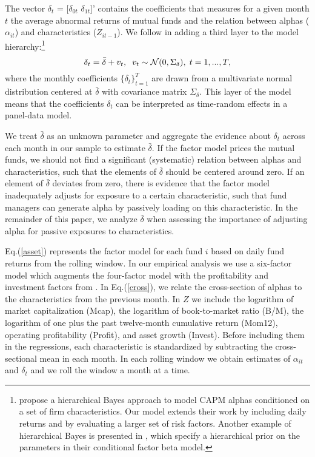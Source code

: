 The vector $\delta_t$ = [$\delta_{0t}$ $\delta_{1t}$]' contains the coefficients that measures for a given month $t$  the average abnormal returns of mutual funds and the relation between alphas ($\alpha_{it}$) and characteristics ($Z_{it-1}$). We follow \citet{cederburg2015asset} in adding a third layer to the model hierarchy:\footnote{\citet{cederburg2015asset} propose a hierarchical Bayes approach to model CAPM alphas conditioned on a set of firm characteristics. Our model extends their work by including daily returns and by evaluating a larger set of risk factors. Another example of hierarchical Bayes is presented in \citet{cosemans2015estimating}, which specify a hierarchical prior on the parameters in their conditional factor beta model. } 
\begin{equation}
\label{delta_t}
\delta_t = \bar{\delta} + v_t, \hspace{0.2cm} v_t \sim \mathcal{N}(0,\Sigma_{\delta}), \hspace{0.1cm} t = 1,...,T,
\end{equation}
where the monthly coefficients $\{\delta_t\}^T_{t=1}$ are drawn from a multivariate normal distribution centered at $\bar{\delta}$ with covariance matrix $\Sigma_\delta$. This layer of the model means that the coefficients $\delta_t$ can be interpreted as time-random effects in a panel-data model.

We treat $\bar{\delta}$ as an unknown parameter and aggregate the evidence about $\delta_t$ across each month in our sample to estimate $\bar{\delta}$. If the factor model prices the mutual funds, we should not find a significant (systematic) relation between alphas and characteristics, such that the elements of $\bar{\delta}$ should be centered around zero. If an element of $\bar{\delta}$ deviates from zero, there is evidence that the factor model inadequately adjusts for exposure to a certain characteristic, such that fund managers can generate alpha by passively loading on this characteristic. In the remainder of this paper, we analyze $\bar{\delta}$ when assessing the importance of adjusting alpha for passive exposures to characteristics.

Eq.(\ref{asset}) represents the factor model for each fund $i$ based on daily fund returns from the rolling window. In our empirical analysis we use a six-factor model which augments the \citet{carhart1997persistence} four-factor model with the profitability and investment factors from \citet{FAMA20151}.
In Eq.(\ref{cross}), we relate the cross-section of alphas to the  characteristics from the previous month. In $Z$ we include the logarithm of market capitalization (Mcap), the logarithm of book-to-market ratio (B/M), the logarithm of one plus the past twelve-month cumulative return (Mom12), operating profitability (Profit), and asset growth (Invest). Before including them in the regressions, each characteristic is standardized by subtracting the cross-sectional mean in each month. In each rolling window we obtain estimates of $\alpha_{it}$ and $\delta_t$ and we roll the window a month at a time. 

